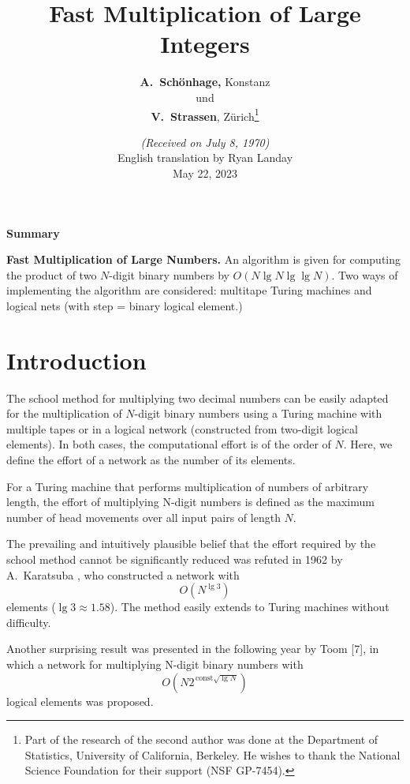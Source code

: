\documentclass{article}
\begin{document}
\title{Fast Multiplication of Large Integers}
\author{\textbf{A.\ Schönhage,} Konstanz \\ und \\ \textbf{V.\ Strassen}, Zürich\footnote{Part of the research of the second author was done at the Department of Statistics, University of California, Berkeley. He wishes to thank the National Science Foundation for their support (NSF GP-7454).}}
\date{\textit{(Received on July 8, 1970)} \\ \bigskip English translation by Ryan Landay \\ May 22, 2023}
\renewcommand{\thefootnote}{\arabic{footnote}}
\maketitle
\begin{center}
\textbf{Summary}
\end{center}

\textbf{Fast Multiplication of Large Numbers.} An algorithm is given for computing the product of two $N$-digit binary numbers by $O(N \lg N \lg \lg N)$. Two ways of implementing the algorithm are considered: multitape Turing machines and logical nets (with step = binary logical element.)

\section{Introduction}

The school method for multiplying two decimal numbers can be easily adapted for the multiplication of $N$-digit binary numbers using a Turing machine with multiple tapes or in a logical network (constructed from two-digit logical elements). In both cases, the computational effort is of the order of $N$. Here, we define the effort of a network as the number of its elements.

For a Turing machine that performs multiplication of numbers of arbitrary length, the effort of multiplying N-digit numbers is defined as the maximum number of head movements over all input pairs of length $N$.

The prevailing and intuitively plausible belief that the effort required by the school method cannot be significantly reduced was refuted in 1962 by A.\ Karatsuba \cite{karatsuba}, who constructed a network with
\[
O\left(N^{\lg 3}\right)
\]
elements ($\lg 3 \approx 1.58$). The method easily extends to Turing machines without difficulty.

Another surprising result was presented in the following year by Toom [7], in which a network for multiplying N-digit binary numbers with
\[
O(N 2^{\, \text{const} \sqrt{\lg N}})
\] logical elements was proposed.
\end{document}
